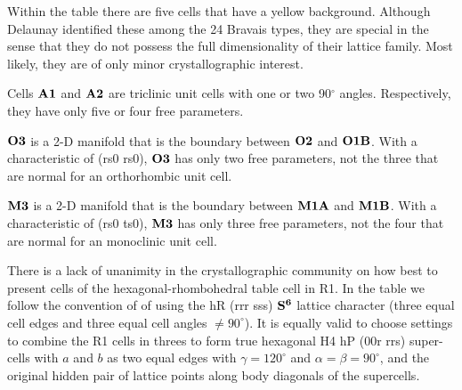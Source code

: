 \documentclass[preprint]{iucr}              %
\numberwithin{equation}{section}
\newcommand{\SVI}[0]{$\bf{S^{6}}$}
\begin{document}
	Within the table there are five cells that have a yellow
	background. Although Delaunay identified these among the 24
	Bravais types, they are special in the sense that they
	do not possess the full dimensionality of their lattice
	family. Most likely, they are of only minor crystallographic 
	interest.
	
	Cells $\bf{A1}$ and $\bf{A2}$ are triclinic unit cells with 
	one or two 90$^{\circ}$ angles. Respectively, they have only five
	or four free parameters.
	
	$\bf{O3}$ is a 2-D manifold that is the boundary between
	 $\bf{O2}$ and $\bf{O1B}$.
	With a characteristic of (rs0 rs0), $\bf{O3}$ has only two
	free parameters, not the three that are normal for an 
	orthorhombic unit cell.

	$\bf{M3}$ is a 2-D manifold that is the boundary between
	 $\bf{M1A}$ and $\bf{M1B}$.
	With a characteristic of (rs0 ts0), $\bf{M3}$ has only three
	free parameters, not the four that are normal for an 
	monoclinic unit cell.
	
	There is a lack of unanimity in the crystallographic community
	on how best to present cells of the hexagonal-rhombohedral table cell
	in R1.  In the table we follow the convention of \cite{Burzlaff1985}
	of using the hR (rrr sss) \SVI{} lattice character (three equal
	cell edges and three equal cell angles $ \neq 90^{\circ}$).  It is equally valid to
	choose settings to combine the R1 cells in threes to form true 
	hexagonal H4 hP (00r rrs) super-cells with $a$ and $b$ as two equal edges
	with $\gamma=120^{\circ}$ and $\alpha = \beta = 90^{\circ}$, and the original
	hidden pair of lattice points along body diagonals of the supercells.
	
	

\end{document}
